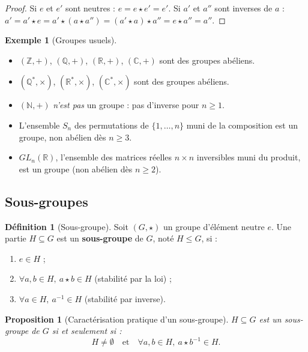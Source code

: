\documentclass[12pt,a4paper]{report}
\newtheorem{proposition}[theoreme]{Proposition}
\theoremstyle{definition}
\newtheorem{definition}{Définition}[section]
\newtheorem{exemple}{Exemple}[section]
\theoremstyle{remark}
\begin{document}
\begin{proof}
Si $e$ et $e'$ sont neutres : $e = e \star e' = e'$. Si $a'$ et $a''$ sont inverses de $a$ : $a' = a' \star e = a' \star (a \star a'') = (a' \star a) \star a'' = e \star a'' = a''$.
\end{proof}

\begin{exemple}[Groupes usuels]
\begin{itemize}
    \item $(\mathbb{Z}, +)$, $(\mathbb{Q}, +)$, $(\mathbb{R}, +)$, $(\mathbb{C}, +)$ sont des groupes abéliens.
    \item $(\mathbb{Q}^*, \times)$, $(\mathbb{R}^*, \times)$, $(\mathbb{C}^*, \times)$ sont des groupes abéliens.
    \item $(\mathbb{N}, +)$ \emph{n'est pas} un groupe : pas d'inverse pour $n \ge 1$.
    \item L'ensemble $S_n$ des permutations de $\{1, \dots, n\}$ muni de la composition est un groupe, non abélien dès $n \ge 3$.
    \item $GL_n(\mathbb{R})$, l'ensemble des matrices réelles $n \times n$ inversibles muni du produit, est un groupe (non abélien dès $n \ge 2$).
\end{itemize}
\end{exemple}

\subsection{Sous-groupes}

\begin{definition}[Sous-groupe]
Soit $(G, \star)$ un groupe d'élément neutre $e$. Une partie $H \subseteq G$ est un \textbf{sous-groupe} de $G$, noté $H \le G$, si :
\begin{enumerate}
    \item $e \in H$ ;
    \item $\forall a, b \in H,\ a \star b \in H$ \quad (stabilité par la loi) ;
    \item $\forall a \in H,\ a^{-1} \in H$ \quad (stabilité par inverse).
\end{enumerate}
\end{definition}

\begin{proposition}[Caractérisation pratique d'un sous-groupe]
$H \subseteq G$ est un sous-groupe de $G$ si et seulement si :
\[ H \neq \emptyset \quad \text{et} \quad \forall a, b \in H,\ a \star b^{-1} \in H. \]
\end{proposition}
\end{document}

